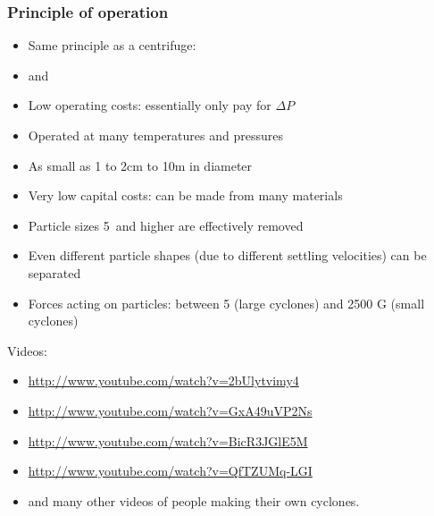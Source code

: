 \begin{frame}\frametitle{Principle of operation}
	\begin{itemize}
		\item	Same principle as a centrifuge: \textbf{{\color{myGreen}{density difference required}}}
		\item	{\color{myOrange}{No moving parts!}} and {\color{myOrange}{no consumable components!}}
		\item	Low operating costs: essentially only pay for $\Delta P$
		\item	Operated at many temperatures and pressures  %
		\item	As small as 1 to 2cm to 10m in diameter %
		\item	Very low capital costs: can be made from many materials
		\item	Particle sizes 5\micron\, and higher are effectively removed  %
		\item	Even different particle shapes (due to different settling velocities) can be separated
		\item	Forces acting on particles: between 5 (large cyclones) and 2500 G (small cyclones)  %
	\end{itemize}
	\vspace{8pt}
	Videos:
	\begin{itemize}
		\item	\href{http://www.youtube.com/watch?v=2bUlytvimy4}{http://www.youtube.com/watch?v=2bUlytvimy4}
		\item	\href{http://www.youtube.com/watch?v=GxA49uVP2Ns}{http://www.youtube.com/watch?v=GxA49uVP2Ns}
		\item	\href{http://www.youtube.com/watch?v=BicR3JGlE5M}{http://www.youtube.com/watch?v=BicR3JGlE5M}
		\item	\href{http://www.youtube.com/watch?v=QfTZUMq-LGI}{http://www.youtube.com/watch?v=QfTZUMq-LGI}
		\item	and many other videos of people making their own cyclones.
	\end{itemize}
\end{frame}

